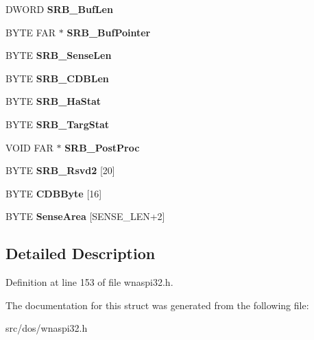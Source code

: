 \begin{DoxyCompactItemize}
\item 
\hypertarget{structSRB__ExecSCSICmd_a10d1f17035d0f8de9057847df6818f26}{D\-W\-O\-R\-D {\bfseries S\-R\-B\-\_\-\-Buf\-Len}}\label{structSRB__ExecSCSICmd_a10d1f17035d0f8de9057847df6818f26}

\item 
\hypertarget{structSRB__ExecSCSICmd_afcd8f817c54290bc2b150d3371190dae}{B\-Y\-T\-E F\-A\-R $\ast$ {\bfseries S\-R\-B\-\_\-\-Buf\-Pointer}}\label{structSRB__ExecSCSICmd_afcd8f817c54290bc2b150d3371190dae}

\item 
\hypertarget{structSRB__ExecSCSICmd_a194700583a157a333baf46f9c1035b7e}{B\-Y\-T\-E {\bfseries S\-R\-B\-\_\-\-Sense\-Len}}\label{structSRB__ExecSCSICmd_a194700583a157a333baf46f9c1035b7e}

\item 
\hypertarget{structSRB__ExecSCSICmd_a551f03b323695a57a14b281099bf6436}{B\-Y\-T\-E {\bfseries S\-R\-B\-\_\-\-C\-D\-B\-Len}}\label{structSRB__ExecSCSICmd_a551f03b323695a57a14b281099bf6436}

\item 
\hypertarget{structSRB__ExecSCSICmd_aa16d85f788d52c35f7751efab0801815}{B\-Y\-T\-E {\bfseries S\-R\-B\-\_\-\-Ha\-Stat}}\label{structSRB__ExecSCSICmd_aa16d85f788d52c35f7751efab0801815}

\item 
\hypertarget{structSRB__ExecSCSICmd_a2984a38f624deeede32516ab28e07844}{B\-Y\-T\-E {\bfseries S\-R\-B\-\_\-\-Targ\-Stat}}\label{structSRB__ExecSCSICmd_a2984a38f624deeede32516ab28e07844}

\item 
\hypertarget{structSRB__ExecSCSICmd_aa6b114860e006c2a07f1e1c6d555c8ca}{V\-O\-I\-D F\-A\-R $\ast$ {\bfseries S\-R\-B\-\_\-\-Post\-Proc}}\label{structSRB__ExecSCSICmd_aa6b114860e006c2a07f1e1c6d555c8ca}

\item 
\hypertarget{structSRB__ExecSCSICmd_ab57d232652be93e509a2d19154f9f917}{B\-Y\-T\-E {\bfseries S\-R\-B\-\_\-\-Rsvd2} \mbox{[}20\mbox{]}}\label{structSRB__ExecSCSICmd_ab57d232652be93e509a2d19154f9f917}

\item 
\hypertarget{structSRB__ExecSCSICmd_a810351a495ba0e68621d21d0324bcd41}{B\-Y\-T\-E {\bfseries C\-D\-B\-Byte} \mbox{[}16\mbox{]}}\label{structSRB__ExecSCSICmd_a810351a495ba0e68621d21d0324bcd41}

\item 
\hypertarget{structSRB__ExecSCSICmd_a5467fa6486a10780cc603e90ebf79e22}{B\-Y\-T\-E {\bfseries Sense\-Area} \mbox{[}S\-E\-N\-S\-E\-\_\-\-L\-E\-N+2\mbox{]}}\label{structSRB__ExecSCSICmd_a5467fa6486a10780cc603e90ebf79e22}

\end{DoxyCompactItemize}


\subsection{Detailed Description}


Definition at line 153 of file wnaspi32.\-h.



The documentation for this struct was generated from the following file\-:\begin{DoxyCompactItemize}
\item 
src/dos/wnaspi32.\-h\end{DoxyCompactItemize}
